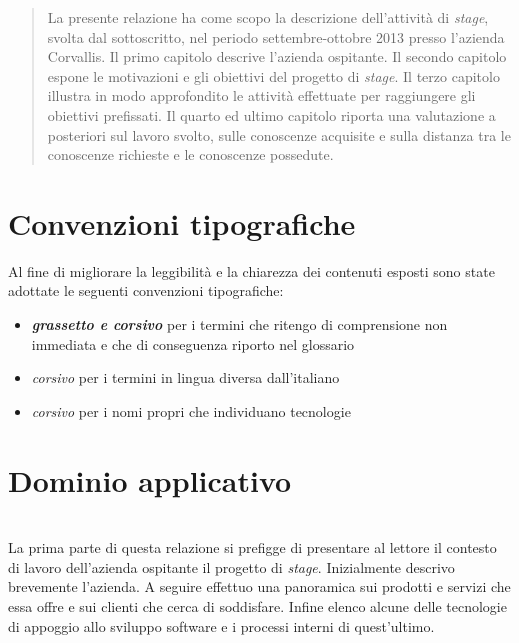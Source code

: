\newcommand{\Versione}{1.0}%
\newcommand{\Data}{2013-01-21}%




\null\vspace{2.0in}
\begin{abstract}
La presente relazione ha come scopo la descrizione dell'attività di \emph{stage}, svolta dal sottoscritto, nel periodo settembre-ottobre 2013 presso l'azienda Corvallis. Il primo capitolo descrive l'azienda ospitante. Il secondo capitolo espone le motivazioni e gli obiettivi del progetto di \emph{stage}. Il terzo capitolo illustra in modo approfondito le attività effettuate per raggiungere gli obiettivi prefissati. Il quarto ed ultimo capitolo riporta una valutazione a posteriori sul lavoro svolto, sulle conoscenze acquisite e sulla distanza tra le conoscenze richieste e le conoscenze possedute.
\end{abstract}
\vspace{\fill}
%
\newpage
\section*{Convenzioni tipografiche}
Al fine di migliorare la leggibilità e la chiarezza dei contenuti esposti sono state adottate le seguenti convenzioni tipografiche:
\begin{itemize}
\item \textbf{\emph{grassetto e corsivo}} per i termini che ritengo di comprensione non immediata e che di conseguenza riporto nel glossario
\item \emph{corsivo} per i termini in lingua diversa dall'italiano
\item \emph{corsivo} per i nomi propri che individuano tecnologie
\end{itemize}

\newpage
\tableofcontents

\newpage

\listoftables
\listoffigures

\newpage

\section{Dominio applicativo}\\
\label{1.0}
La prima parte di questa relazione si prefigge di presentare al lettore il contesto di lavoro dell'azienda ospitante il progetto di \emph{stage}. Inizialmente descrivo brevemente l'azienda. A seguire effettuo una panoramica sui prodotti e servizi che essa offre e sui clienti che cerca di soddisfare. Infine elenco alcune delle tecnologie di appoggio allo sviluppo software e i processi interni di quest'ultimo.

